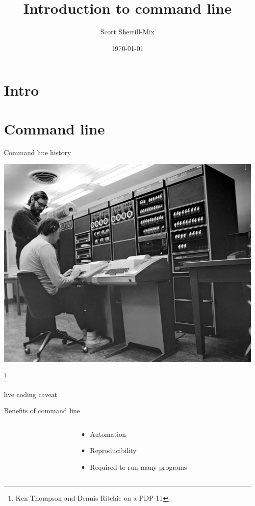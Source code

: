 \documentclass[xcolor=table]{beamer}
\title{\LARGE Introduction to command line}%
\author{\vspace{-.2in}Scott Sherrill-Mix\vspace{-.4in}}
\date{\today\vspace{-.5in}}
\begin{document}
{
\frame[plain]{\vspace{-.3in}\titlepage}
}

\section{Intro}
\section{Command line}
\begin{frame}{Command line history}
\begin{center}
\includegraphics[width=.7\textwidth]{im/Ken_Thompson_(sitting)_and_Dennis_Ritchie_at_PDP-11_(2876612463).jpg}
\end{center}
\footnote{Ken Thompson and Dennis Ritchie on a PDP-11}
\end{frame}
\begin{frame}
  \begin{center}
  \Huge live coding caveat
  \end{center}
\end{frame}

\begin{frame}{Benefits of command line}
\Large
\begin{columns}
\begin{column}{.2\textwidth}
\vspace{.1in}
\end{column}
\begin{column}{.8\textwidth}
\begin{center}
\begin{itemize}
\item Automation
\item Reproducibility
\item Required to run many programs
\end{itemize}
\end{center}
\end{column}
\end{columns}
\end{frame}
\end{document}
